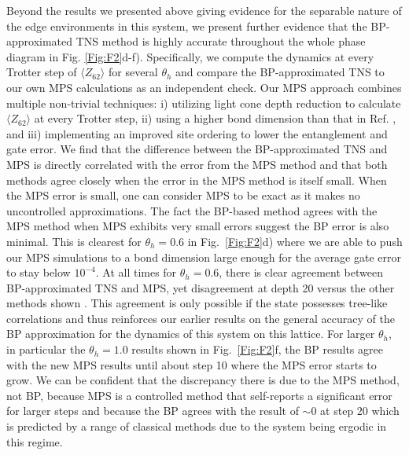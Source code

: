 \documentclass[%
 superscriptaddress,
 amsmath,amssymb,
 prx, nofootinbib,
]{revtex4-2}
\begin{document}
Beyond the results we presented above giving evidence for the separable nature of the edge environments in this system, we present further evidence that the  BP-approximated TNS method is highly accurate throughout the whole phase diagram in Fig. \ref{Fig:F2}d-f).
Specifically, we compute the dynamics at every Trotter step of $\langle Z_{62} \rangle$ for several $\theta_{h}$ and compare the BP-approximated TNS to our own MPS calculations as an independent check. Our MPS approach combines multiple non-trivial techniques:  i) utilizing light cone depth reduction to calculate $\langle Z_{62} \rangle$ at every Trotter step, ii) using a higher bond dimension than that in Ref. \cite{kim2023}, and iii) implementing an improved site ordering to lower the entanglement and gate error.
We find that the difference between the BP-approximated TNS and MPS is directly correlated with the error from the MPS method and that both methods agree closely when the error in the MPS method is itself small. 
When the MPS error is small, one can consider MPS to be exact as it makes no uncontrolled approximations.
The fact the BP-based method agrees with the MPS method when MPS exhibits very small errors suggest the BP error is also minimal. 
This is clearest for $\theta_{h} = 0.6$ in Fig.~\ref{Fig:F2}d) where we are able to push our MPS simulations to a bond dimension large enough for the average gate error to stay below $10^{-4}$. At all times for $\theta_{h} = 0.6$, there is clear agreement between BP-approximated TNS and MPS, yet disagreement at depth 20 versus the other methods shown \cite{Zalatel2023, Chan2023, kechedzhi2023, Liao2023}. This agreement is only possible if the state possesses tree-like correlations and thus reinforces our earlier results on the general accuracy of the BP approximation for the dynamics of this system on this lattice.
For larger $\theta_h$, in particular the $\theta_h=1.0$ results shown in Fig.~\ref{Fig:F2}f, the BP results agree with the new MPS results until about step 10 where the MPS error starts to grow. We can be confident that the discrepancy there is due to the MPS method, not BP, because MPS is a controlled method that self-reports a significant error for larger steps and because the BP agrees with the result of $\sim 0$ at step 20 which is predicted by a range of classical methods \cite{Liao2023, Zalatel2023, kechedzhi2023, Chan2023} due to the system being ergodic in this regime.
\end{document}
